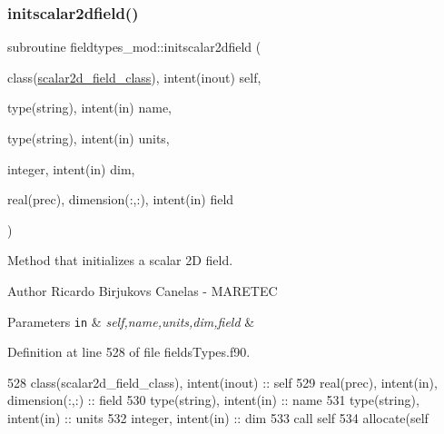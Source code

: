 \subsubsection{\texorpdfstring{initscalar2dfield()}{initscalar2dfield()}}
{\footnotesize\ttfamily subroutine fieldtypes\+\_\+mod\+::initscalar2dfield (\begin{DoxyParamCaption}\item[{class(\mbox{\hyperlink{structfieldtypes__mod_1_1scalar2d__field__class}{scalar2d\+\_\+field\+\_\+class}}), intent(inout)}]{self,  }\item[{type(string), intent(in)}]{name,  }\item[{type(string), intent(in)}]{units,  }\item[{integer, intent(in)}]{dim,  }\item[{real(prec), dimension(\+:,\+:), intent(in)}]{field }\end{DoxyParamCaption})\hspace{0.3cm}{\ttfamily [private]}}



Method that initializes a scalar 2D field. 

\begin{DoxyAuthor}{Author}
Ricardo Birjukovs Canelas -\/ M\+A\+R\+E\+T\+EC 
\end{DoxyAuthor}

\begin{DoxyParams}[1]{Parameters}
\mbox{\tt in}  & {\em self,name,units,dim,field} & \\
\hline
\end{DoxyParams}


Definition at line 528 of file fields\+Types.\+f90.


\begin{DoxyCode}
528     \textcolor{keywordtype}{class}(scalar2d\_field\_class), \textcolor{keywordtype}{intent(inout)} :: self
529     \textcolor{keywordtype}{real(prec)}, \textcolor{keywordtype}{intent(in)}, \textcolor{keywordtype}{dimension(:,:)} :: field
530     \textcolor{keywordtype}{type}(string), \textcolor{keywordtype}{intent(in)} :: name
531     \textcolor{keywordtype}{type}(string), \textcolor{keywordtype}{intent(in)} :: units
532     \textcolor{keywordtype}{integer}, \textcolor{keywordtype}{intent(in)} :: dim
533     \textcolor{keyword}{call }self%
534     \textcolor{keyword}{allocate}(self%
\end{DoxyCode}
\mbox{\label{namespacefieldtypes__mod_a3f2b90bc391ea5b84ead8069ee90f515}} 
